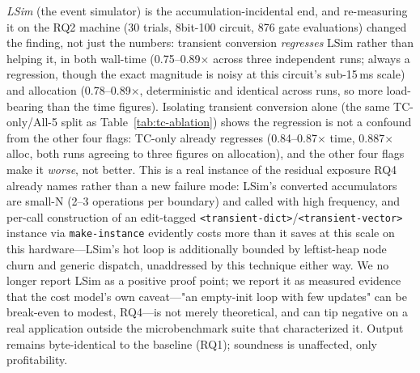 \documentclass[sigplan,review,anonymous]{acmart}
\begin{document}
\emph{LSim} (the event simulator) is the accumulation-incidental end, and re-measuring it on the RQ2 machine (30 trials, 8bit-100 circuit, 876 gate evaluations) changed the finding, not just the numbers: transient conversion \emph{regresses} LSim rather than helping it, in both wall-time (0.75--0.89$\times$ across three independent runs; always a regression, though the exact magnitude is noisy at this circuit's sub-15\,ms scale) and allocation (0.78--0.89$\times$, deterministic and identical across runs, so more load-bearing than the time figures). Isolating transient conversion alone (the same TC-only/All-5 split as Table~\ref{tab:tc-ablation}) shows the regression is not a confound from the other four flags: TC-only already regresses (0.84--0.87$\times$ time, 0.887$\times$ alloc, both runs agreeing to three figures on allocation), and the other four flags make it \emph{worse}, not better. This is a real instance of the residual exposure RQ4 already names rather than a new failure mode: LSim's converted accumulators are small-N (2--3 operations per boundary) and called with high frequency, and per-call construction of an edit-tagged \texttt{<transient-dict>}/\texttt{<transient-vector>} instance via \texttt{make-instance} evidently costs more than it saves at this scale on this hardware---LSim's hot loop is additionally bounded by leftist-heap node churn and generic dispatch, unaddressed by this technique either way. We no longer report LSim as a positive proof point; we report it as measured evidence that the cost model's own caveat---"an empty-init loop with few updates" can be break-even to modest, RQ4---is not merely theoretical, and can tip negative on a real application outside the microbenchmark suite that characterized it. Output remains byte-identical to the baseline (RQ1); soundness is unaffected, only profitability.
\end{document}
